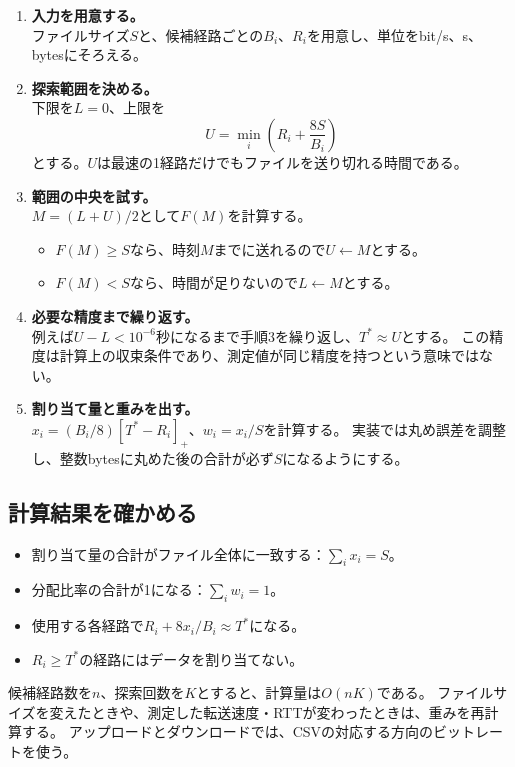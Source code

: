 \documentclass[a4paper,11pt]{article}
\newcommand{\positive}[1]{\left[#1\right]_{+}}
\begin{document}
\begin{enumerate}
 \item \textbf{入力を用意する。}\\
 ファイルサイズ$S$と、候補経路ごとの$B_i$、$R_i$を用意し、単位をbit/s、s、bytesにそろえる。
 \item \textbf{探索範囲を決める。}\\
 下限を$L=0$、上限を
 \[
   U=\min_i\left(R_i+\frac{8S}{B_i}\right)
 \]
 とする。$U$は最速の1経路だけでもファイルを送り切れる時間である。
 \item \textbf{範囲の中央を試す。}\\
 $M=(L+U)/2$として$F(M)$を計算する。
 \begin{itemize}
  \item $F(M)\ge S$なら、時刻$M$までに送れるので$U\leftarrow M$とする。
  \item $F(M)<S$なら、時間が足りないので$L\leftarrow M$とする。
 \end{itemize}
 \item \textbf{必要な精度まで繰り返す。}\\
 例えば$U-L<10^{-6}$秒になるまで手順3を繰り返し、$T^*\approx U$とする。
 この精度は計算上の収束条件であり、測定値が同じ精度を持つという意味ではない。
 \item \textbf{割り当て量と重みを出す。}\\
 $x_i=(B_i/8)\positive{T^*-R_i}$、$w_i=x_i/S$を計算する。
 実装では丸め誤差を調整し、整数bytesに丸めた後の合計が必ず$S$になるようにする。
\end{enumerate}

\subsection{計算結果を確かめる}
\begin{itemize}
 \item 割り当て量の合計がファイル全体に一致する：$\sum_i x_i=S$。
 \item 分配比率の合計が1になる：$\sum_i w_i=1$。
 \item 使用する各経路で$R_i+8x_i/B_i\approx T^*$になる。
 \item $R_i\ge T^*$の経路にはデータを割り当てない。
\end{itemize}

候補経路数を$n$、探索回数を$K$とすると、計算量は$O(nK)$である。
ファイルサイズを変えたときや、測定した転送速度・RTTが変わったときは、重みを再計算する。
アップロードとダウンロードでは、CSVの対応する方向のビットレートを使う。
\end{document}
